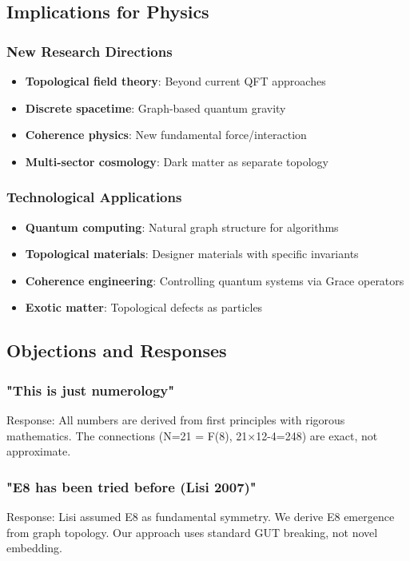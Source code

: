 \documentclass[12pt,a4paper]{article}
\begin{document}
\subsection{Implications for Physics}

\subsubsection{New Research Directions}
\begin{itemize}
\item \textbf{Topological field theory}: Beyond current QFT approaches
\item \textbf{Discrete spacetime}: Graph-based quantum gravity
\item \textbf{Coherence physics}: New fundamental force/interaction
\item \textbf{Multi-sector cosmology}: Dark matter as separate topology
\end{itemize}

\subsubsection{Technological Applications}
\begin{itemize}
\item \textbf{Quantum computing}: Natural graph structure for algorithms
\item \textbf{Topological materials}: Designer materials with specific invariants
\item \textbf{Coherence engineering}: Controlling quantum systems via Grace operators
\item \textbf{Exotic matter}: Topological defects as particles
\end{itemize}

\subsection{Objections and Responses}

\subsubsection{"This is just numerology"}
Response: All numbers are derived from first principles with rigorous mathematics. The connections (N=21 = F(8), 21×12-4=248) are exact, not approximate.

\subsubsection{"E8 has been tried before (Lisi 2007)"}
Response: Lisi assumed E8 as fundamental symmetry. We derive E8 emergence from graph topology. Our approach uses standard GUT breaking, not novel embedding.
\end{document}
